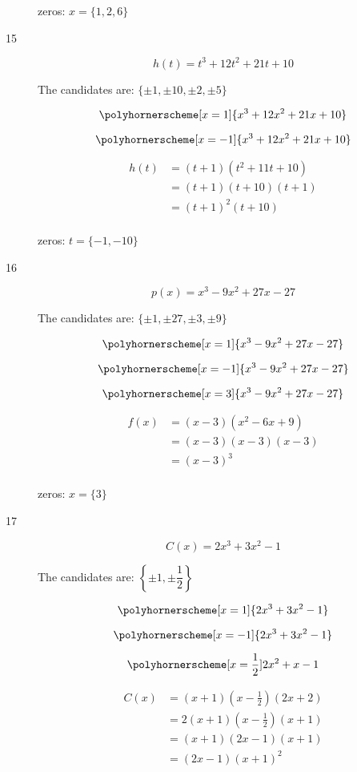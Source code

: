 \documentclass[fleqn,addpoints]{exam}
\begin{document}
\begin{description}
zeros: $x = \{ 1, 2, 6 \}$

\item[15]
\[ 
  h(t) = t^3+12t^2+21t+10
\]

The candidates are: $\{\pm 1, \pm 10, \pm 2, \pm 5 \}$

\[ 
  \polyhornerscheme[x=1]{x^3+12x^2+21x+10}
\]

\[ 
  \polyhornerscheme[x=-1]{x^3+12x^2+21x+10}
\]

\begin{align*}
  h(t) &=  (t+1)(t^2 + 11t + 10) \\
  &=  (t+1)(t+10)(t+1) \\
  &=  (t+1)^2(t+10) \\
\end{align*}

zeros: $t = \{ -1, -10 \}$

\item[16]
\[ 
  p(x) = x^3 - 9x^2 + 27x - 27
\]

The candidates are: $\{\pm 1, \pm 27, \pm 3, \pm 9 \}$

\[ 
  \polyhornerscheme[x=1]{x^3 - 9x^2 + 27x - 27}
\]

\[ 
  \polyhornerscheme[x=-1]{x^3 - 9x^2 + 27x - 27}
\]

\[ 
  \polyhornerscheme[x=3]{x^3 - 9x^2 + 27x - 27}
\]

\begin{align*}
  f(x) &=  (x-3)(x^2-6x+9) \\
  &=  (x-3)(x-3)(x-3) \\
  &=  (x-3)^3 \\
\end{align*}

zeros: $x = \{ 3 \}$

\item[17]
\[ 
  C(x) =  2x^3 + 3x^2 - 1
\]

The candidates are: $\left \{\pm 1, \pm \dfrac{1}{2} \right \}$

\[ 
  \polyhornerscheme[x=1]{2x^3 + 3x^2 - 1}
\]

\[ 
  \polyhornerscheme[x=-1]{2x^3 + 3x^2 - 1}
\]

\[ 
  \polyhornerscheme[x=\frac{1}{2}]{2x^2 + x - 1}
\]

\begin{align*}
  C(x) &=  (x+1)(x-\frac{1}{2})(2x+2) \\
  &=  2(x+1)(x-\frac{1}{2})(x+1) \\
  &=  (x+1)(2x-1)(x+1) \\
  &=  (2x-1)(x+1)^2 \\
\end{align*}


\end{description}
\end{document}
